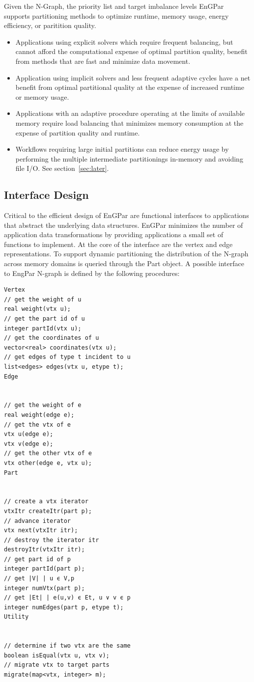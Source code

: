 \documentclass[12pt]{article}
\begin{document}
Given the N-Graph, the priority list and target imbalance levels EnGPar supports
partitioning methods to optimize runtime, memory usage, energy efficiency, or
paritition quality.
\begin{itemize}
  \item Applications using explicit solvers which require frequent balancing,
    but cannot afford the computational expense of optimal partition quality,
    benefit from methods that are fast and minimize data movement.
  \item Application using implicit solvers and less frequent adaptive cycles
    have a net benefit from optimal partitional quality at the expense of
    increased runtime or memory usage.
  \item Applications with an adaptive procedure operating at the limits of
    available memory require load balancing that minimizes memory consumption at
    the expense of partition quality and runtime.
  \item Workflows requiring large initial partitions can reduce energy usage by
    performing the multiple intermediate partitionings in-memory and avoiding
    file I/O. See section~\ref{sec:later}.
\end{itemize}


\subsection{Interface Design}

Critical to the efficient design of EnGPar are functional interfaces to
applications that abstract the underlying data structures.
EnGPar minimizes the number of application data transformations by providing
applications a small set of functions to implement.
At the core of the interface are the vertex and edge representations.
To support dynamic partitioning the distribution of the N-graph across memory
domains is queried through the Part object.
A possible interface to EngPar N-graph is defined by the following procedures:

\begin{verbatim}
Vertex
// get the weight of u
real weight(vtx u); 
// get the part id of u
integer partId(vtx u); 
// get the coordinates of u
vector<real> coordinates(vtx u);
// get edges of type t incident to u
list<edges> edges(vtx u, etype t); 
Edge


// get the weight of e
real weight(edge e); 
// get the vtx of e
vtx u(edge e);
vtx v(edge e); 
// get the other vtx of e
vtx other(edge e, vtx u);
Part


// create a vtx iterator 
vtxItr createItr(part p); 
// advance iterator
vtx next(vtxItr itr);
// destroy the iterator itr
destroyItr(vtxItr itr);
// get part id of p
integer partId(part p);
// get |V| | u ϵ V,p 
integer numVtx(part p);
// get |Et| | e(u,v) ϵ Et, u ∨ v ϵ p 
integer numEdges(part p, etype t);
Utility


// determine if two vtx are the same
boolean isEqual(vtx u, vtx v); 
// migrate vtx to target parts
migrate(map<vtx, integer> m);
\end{verbatim}
\end{document}
